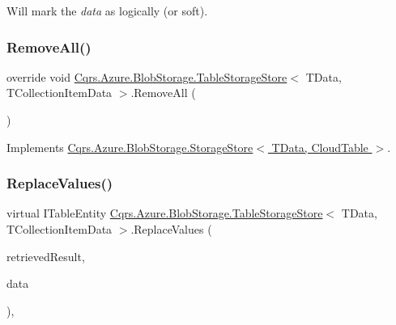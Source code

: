 Will mark the {\itshape data}  as logically (or soft). 

\mbox{\label{classCqrs_1_1Azure_1_1BlobStorage_1_1TableStorageStore_aadd66b35bfa105ef4446bd791e99a3d5_aadd66b35bfa105ef4446bd791e99a3d5}} 
\subsubsection{\texorpdfstring{Remove\+All()}{RemoveAll()}}
{\footnotesize\ttfamily override void \hyperlink{classCqrs_1_1Azure_1_1BlobStorage_1_1TableStorageStore}{Cqrs.\+Azure.\+Blob\+Storage.\+Table\+Storage\+Store}$<$ T\+Data, T\+Collection\+Item\+Data $>$.Remove\+All (\begin{DoxyParamCaption}{ }\end{DoxyParamCaption})\hspace{0.3cm}{\ttfamily [virtual]}}



Implements \hyperlink{classCqrs_1_1Azure_1_1BlobStorage_1_1StorageStore_a4e848f342be903293812b3b660464d1a_a4e848f342be903293812b3b660464d1a}{Cqrs.\+Azure.\+Blob\+Storage.\+Storage\+Store$<$ T\+Data, Cloud\+Table $>$}.

\mbox{\label{classCqrs_1_1Azure_1_1BlobStorage_1_1TableStorageStore_adc625eceee6e2b190997a771740e01b9_adc625eceee6e2b190997a771740e01b9}} 
\subsubsection{\texorpdfstring{Replace\+Values()}{ReplaceValues()}}
{\footnotesize\ttfamily virtual I\+Table\+Entity \hyperlink{classCqrs_1_1Azure_1_1BlobStorage_1_1TableStorageStore}{Cqrs.\+Azure.\+Blob\+Storage.\+Table\+Storage\+Store}$<$ T\+Data, T\+Collection\+Item\+Data $>$.Replace\+Values (\begin{DoxyParamCaption}\item[{Table\+Result}]{retrieved\+Result,  }\item[{T\+Data}]{data }\end{DoxyParamCaption})\hspace{0.3cm}{\ttfamily [protected]}, {\ttfamily [virtual]}}

